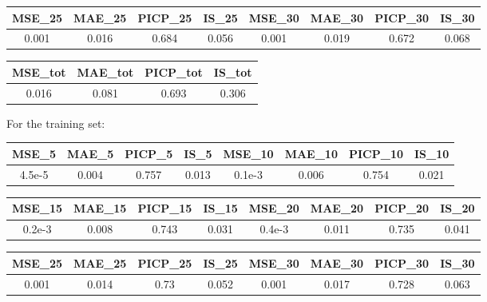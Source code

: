 \documentclass{Configuration_Files/PoliMi3i_thesis}
\begin{document}
\begin{table}[H]
  \centering
  \begin{tabular}{| c | c | c | c | c | c | c | c |}
    \hline
    MSE\_25 & MAE\_25 & PICP\_25 & IS\_25 & MSE\_30 & MAE\_30 & PICP\_30 & IS\_30 \\ \hline
    0.001 & 0.016 & 0.684 & 0.056 & 0.001 & 0.019 & 0.672 & 0.068 \\ \hline
  \end{tabular}
\end{table}

\begin{table}[H]
  \centering
  \begin{tabular}{| c | c | c | c |}
    \hline
    MSE\_tot & MAE\_tot & PICP\_tot & IS\_tot \\ \hline
    0.016 & 0.081 & 0.693 & 0.306 \\ \hline
  \end{tabular}
\end{table}

For the training set:


\begin{table}[H]
  \centering
  \begin{tabular}{| c | c | c | c | c | c | c | c |}
    \hline
    MSE\_5 & MAE\_5 & PICP\_5 & IS\_5 & MSE\_10 & MAE\_10 & PICP\_10 & IS\_10 \\ \hline
    4.5e-5 & 0.004 & 0.757 & 0.013 & 0.1e-3 & 0.006 & 0.754 & 0.021 \\ \hline
  \end{tabular}
\end{table}

\begin{table}[H]
  \centering
  \begin{tabular}{| c | c | c | c | c | c | c | c |}
    \hline
    MSE\_15 & MAE\_15 & PICP\_15 & IS\_15 & MSE\_20 & MAE\_20 & PICP\_20 & IS\_20 \\ \hline
    0.2e-3 & 0.008 & 0.743 & 0.031 & 0.4e-3 & 0.011 & 0.735 & 0.041 \\ \hline
  \end{tabular}
\end{table}

\begin{table}[H]
  \centering
  \begin{tabular}{| c | c | c | c | c | c | c | c |}
    \hline
    MSE\_25 & MAE\_25 & PICP\_25 & IS\_25 & MSE\_30 & MAE\_30 & PICP\_30 & IS\_30 \\ \hline
    0.001 & 0.014 & 0.73 & 0.052 & 0.001 & 0.017 & 0.728 & 0.063 \\ \hline
  \end{tabular}
\end{table}
\end{document}
